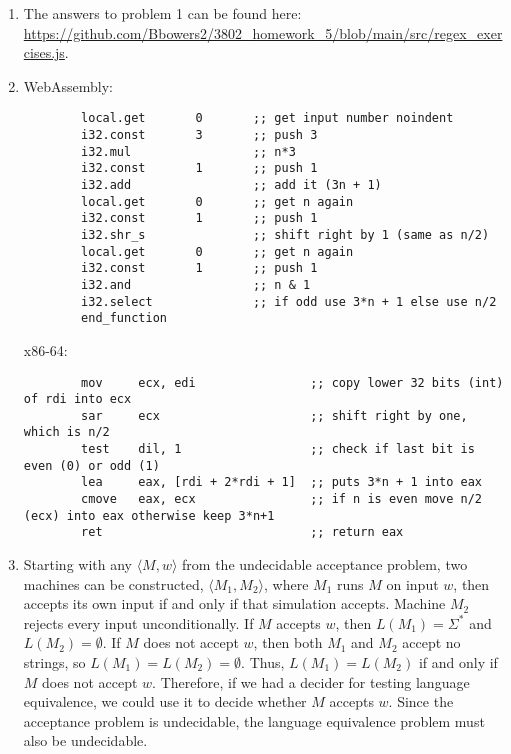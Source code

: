 \documentclass[11pt, letterpaper]{article}
\begin{document}
\begin{enumerate}
    \item The answers to problem 1 can be found here: \url{https://github.com/Bbowers2/3802_homework_5/blob/main/src/regex_exercises.js}.
    
    \item WebAssembly:
    \begin{lstlisting}
        local.get       0       ;; get input number noindent
        i32.const       3       ;; push 3
        i32.mul                 ;; n*3
        i32.const       1       ;; push 1
        i32.add                 ;; add it (3n + 1)
        local.get       0       ;; get n again
        i32.const       1       ;; push 1
        i32.shr_s               ;; shift right by 1 (same as n/2)
        local.get       0       ;; get n again
        i32.const       1       ;; push 1
        i32.and                 ;; n & 1
        i32.select              ;; if odd use 3*n + 1 else use n/2
        end_function
        \end{lstlisting}

    x86-64:
    \begin{lstlisting}
        mov     ecx, edi                ;; copy lower 32 bits (int) of rdi into ecx
        sar     ecx                     ;; shift right by one, which is n/2
        test    dil, 1                  ;; check if last bit is even (0) or odd (1)
        lea     eax, [rdi + 2*rdi + 1]  ;; puts 3*n + 1 into eax
        cmove   eax, ecx                ;; if n is even move n/2 (ecx) into eax otherwise keep 3*n+1
        ret                             ;; return eax
        \end{lstlisting}

    \item Starting with any $\langle M, w \rangle$ from the undecidable acceptance problem, two machines can be constructed, $\langle M_1, M_2 \rangle$, where $M_1$ runs $M$ on input $w$, then accepts its own input if and only if that simulation accepts. Machine $M_2$ rejects every input unconditionally. If $M$ accepts $w$, then $L(M_1) = \Sigma^*$ and $L(M_2) = \emptyset$. If $M$ does not accept $w$, then both $M_1$ and $M_2$ accept no strings, so $L(M_1) = L(M_2) = \emptyset$. Thus, $L(M_1) = L(M_2)$ if and only if $M$ does not accept $w$. Therefore, if we had a decider for testing language equivalence, we could use it to decide whether $M$ accepts $w$. Since the acceptance problem is undecidable, the language equivalence problem must also be undecidable.
\end{enumerate}
\end{document}
